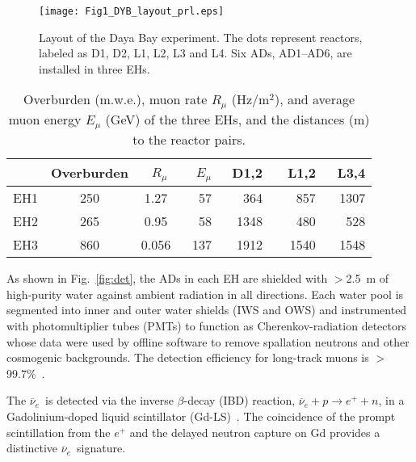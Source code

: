 \documentclass[aps,prl,showpacs,showkeys,amsmath,amssymb,
twocolumn,
floatfix,
superscriptaddress
]{revtex4-1}
\newcommand{\nuebar}{$\overline{\nu}_{e}$}
\begin{document}
\begin{figure}[htb]
\texttt{[image: Fig1\_DYB\_layout\_prl.eps]}
\caption{Layout of the Daya Bay experiment.
The dots represent reactors, labeled as D1, D2, L1, L2, L3 and L4.
Six ADs, AD1--AD6, are installed in three EHs. \label{fig:layout}}
\end{figure}


\begin{table}[htb]
\begin{center}
\begin{tabular}[c]{cccrrrr} \hline\hline
& Overburden & \mbox{ }$R_\mu$ &\mbox{ } $E_\mu$ & \mbox{  }D1,2 &\mbox{  } L1,2 & \mbox{   }L3,4 \\\hline
EH1 & 250 & 1.27 & 57 & 364 & 857 & 1307\\
EH2 & 265 & 0.95 & 58 & 1348 & 480 & 528\\
EH3 & 860 & 0.056 & 137 &\mbox{  }  1912 &\mbox{  }  1540 &\mbox{  }  1548\\\hline
\end{tabular}
\caption{Overburden (m.w.e.), muon rate $R_\mu$ (Hz/m$^2$),
and average muon energy $E_\mu$ (GeV) of the three EHs,
and the distances (m) to the reactor pairs.\label{tab:baseline}}
\end{center}
\end{table}

\par
As shown in Fig.~\ref{fig:det}, the ADs in each EH are shielded with $>$2.5~m of high-purity water against ambient radiation in all directions.  Each water pool is segmented into inner and outer water shields (IWS and OWS) and instrumented with photomultiplier tubes (PMTs) to function as Cherenkov-radiation detectors whose data were used by offline software to remove spallation neutrons and other cosmogenic backgrounds.  The detection efficiency for long-track muons is $>$99.7\%~\cite{ad12}.


\par
The \nuebar\ is detected via the inverse $\beta$-decay (IBD) reaction,
$\overline{\nu}_e + p \to e^+ + n$, in a Gadolinium-doped liquid scintillator
(Gd-LS)~\cite{ding,yeh}\@. The coincidence of the prompt scintillation from the $e^+$ and the
delayed neutron capture on Gd provides a distinctive \nuebar\ signature.
\end{document}

